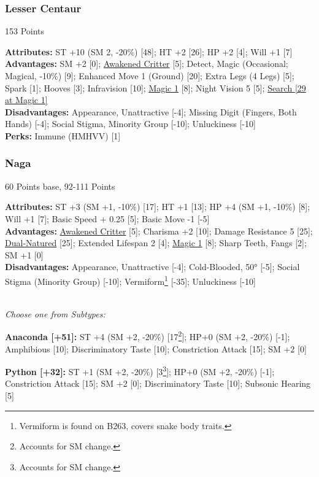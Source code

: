 \begin{multicols*}{3}
	\subsubsection*{Lesser Centaur}
	\begin{flushright}
		153 Points
	\end{flushright}
	\textbf{Attributes:}
	ST +10 (SM 2, -20\%) [48]; HT +2 [26]; HP +2 [4]; Will +1 [7]
	\\\textbf{Advantages:}
	SM +2 [0]; \hyperref[awakened_critter]{Awakened Critter} [5]; Detect, Magic (Occasional; Magical, -10\%) [9]; Enhanced Move 1 (Ground) [20]; Extra Legs (4 Legs) [5]; Spark [1]; Hooves [3]; Infravision [10]; \hyperref[magic]{Magic 1} [8]; Night Vision 5 [5]; \hyperref[search]{Search [29 at Magic 1]}
	\\\textbf{Disadvantages:} 
	Appearance, Unattractive [-4]; Missing Digit (Fingers, Both Hands) [-4]; Social Stigma, Minority Group [-10]; Unluckiness [-10]
	\\\textbf{Perks:}
	Immune (HMHVV) [1]
	
	\subsubsection*{Naga}
	\begin{flushright}
		60 Points base, 92-111 Points
	\end{flushright}
	\textbf{Attributes:} 
	ST +3 (SM +1, -10\%) [17]; HT +1 [13]; HP +4 (SM +1, -10\%) [8]; Will +1 [7]; Basic Speed + 0.25 [5]; Basic Move -1 [-5]
	\\\textbf{Advantages:} 
	\hyperref[awakened_critter]{Awakened Critter} [5]; Charisma +2 [10]; Damage Resistance 5 [25]; \hyperref[dual_natured]{Dual-Natured} [25]; Extended Lifespan 2 [4]; \hyperref[magic]{Magic 1} [8]; Sharp Teeth, Fangs [2]; SM +1 [0]
	\\\textbf{Disadvantages:}
	Appearance, Unattractive [-4]; Cold-Blooded, 50° [-5]; Social Stigma (Minority Group) [-10];  Vermiform\footnote{Vermiform is found on B263, covers snake body traits.} [-35]; Unluckiness [-10]
	
	\textit{\\Choose one from Subtypes:}
	
	\textbf{Anaconda [+51]:} ST +4 (SM +2, -20\%) [17\footnote{Accounts for SM change.}]; HP+0 (SM +2, -20\%) [-1]; Amphibious [10]; Discriminatory Taste [10]; Constriction Attack [15]; SM +2 [0]
	
	\textbf{Python [+32]:} ST +1 (SM +2, -20\%) [3\footnote{Accounts for SM change.}]; HP+0 (SM +2, -20\%) [-1]; Constriction Attack [15]; SM +2 [0]; Discriminatory Taste [10]; Subsonic Hearing [5]
		

\end{multicols*}

